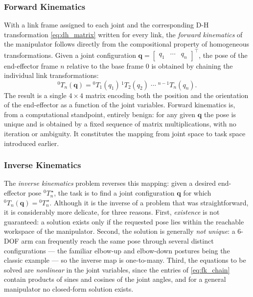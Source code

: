 \subsubsection{Forward Kinematics}
With a link frame assigned to each joint and the corresponding D-H transformation
\eqref{eq:dh_matrix} written for every link, the \textit{forward kinematics} of the
manipulator follows directly from the compositional property of homogeneous
transformations. Given a joint configuration
$\mathbf{q} = \begin{bmatrix} q_1 & \cdots & q_n \end{bmatrix}^\top$, the pose of the
end-effector frame $n$ relative to the base frame $0$ is obtained by chaining the
individual link transformations:
\begin{equation}
    ^0 T_n(\mathbf{q}) = {}^0 T_1(q_1)\, ^1 T_2(q_2) \;\cdots\; ^{n-1} T_n(q_n).
    \label{eq:fk_chain}
\end{equation}
The result is a single $4 \times 4$ matrix encoding both the position and the
orientation of the end-effector as a function of the joint variables. Forward
kinematics is, from a computational standpoint, entirely benign: for any given
$\mathbf{q}$ the pose is unique and is obtained by a fixed sequence of matrix
multiplications, with no iteration or ambiguity. It constitutes the mapping from
joint space to task space introduced earlier.

\subsubsection{Inverse Kinematics}
The \textit{inverse kinematics} problem reverses this mapping: given a desired
end-effector pose $^0 T_n^{\,\star}$, the task is to find a joint configuration
$\mathbf{q}$ for which $^0 T_n(\mathbf{q}) = {}^0 T_n^{\,\star}$. Although it is the
inverse of a problem that was straightforward, it is considerably more delicate, for
three reasons. First, \textit{existence} is not guaranteed: a solution exists only if
the requested pose lies within the reachable workspace of the manipulator. Second, the
solution is generally \textit{not unique}: a 6-DOF arm can frequently reach the same
pose through several distinct configurations --- the familiar elbow-up and elbow-down
postures being the classic example --- so the inverse map is one-to-many. Third, the
equations to be solved are \textit{nonlinear} in the joint variables, since the entries
of \eqref{eq:fk_chain} contain products of sines and cosines of the joint angles, and
for a general manipulator no closed-form solution exists.

